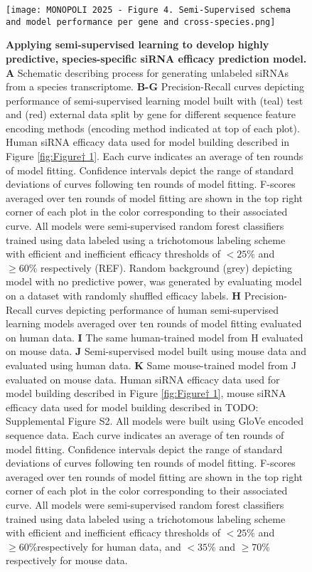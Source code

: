 \documentclass{report}
\begin{document}
\begin{figure}
    \centering
    \texttt{[image: MONOPOLI 2025 - Figure 4. Semi-Supervised schema and model performance per gene and cross-species.png]}
    \caption{\textbf{Applying semi-supervised learning to develop highly predictive, species-specific siRNA efficacy prediction model.} \textbf{A} Schematic describing process for generating unlabeled siRNAs from a species transcriptome. \textbf{B-G} Precision-Recall curves depicting performance of semi-supervised learning model built with (teal) test and (red) external data split by gene for different sequence feature encoding methods (encoding method indicated at top of each plot). Human siRNA efficacy data used for model building described in Figure \ref{fig:Figure† 1}. Each curve indicates an average of ten rounds of model fitting. Confidence intervals depict the range of standard deviations of curves following ten rounds of model fitting. F-scores averaged over ten rounds of model fitting are shown in the top right corner of each plot in the color corresponding to their associated curve. All models were semi-supervised random forest classifiers trained using data labeled using a trichotomous labeling scheme with efficient and inefficient efficacy thresholds of $<25\%$ and $\geq60\%$ respectively (REF). Random background (grey) depicting model with no predictive power, was generated by evaluating model on a dataset with randomly shuffled efficacy labels. \textbf{H} Precision-Recall curves depicting performance of human semi-supervised learning models averaged over ten rounds of model fitting evaluated on human data. \textbf{I} The same human-trained model from H evaluated on mouse data. \textbf{J} Semi-supervised model built using mouse data and evaluated using human data. \textbf{K} Same mouse-trained model from J evaluated on mouse data. Human siRNA efficacy data used for model building described in Figure \ref{fig:Figure† 1}, mouse siRNA efficacy data used for model building described in TODO: Supplemental Figure S2. All models were built using GloVe encoded sequence data. Each curve indicates an average of ten rounds of model fitting. Confidence intervals depict the range of standard deviations of curves following ten rounds of model fitting. F-scores averaged over ten rounds of model fitting are shown in the top right corner of each plot in the color corresponding to their associated curve. All models were semi-supervised random forest classifiers trained using data labeled using a trichotomous labeling scheme with efficient and inefficient efficacy thresholds of $<25\%$ and $\geq60\%$respectively for human data, and $<35\%$ and $\geq70\%$ respectively for mouse data. }
    \label{fig:Figure† 4}
\end{figure}
\end{document}
